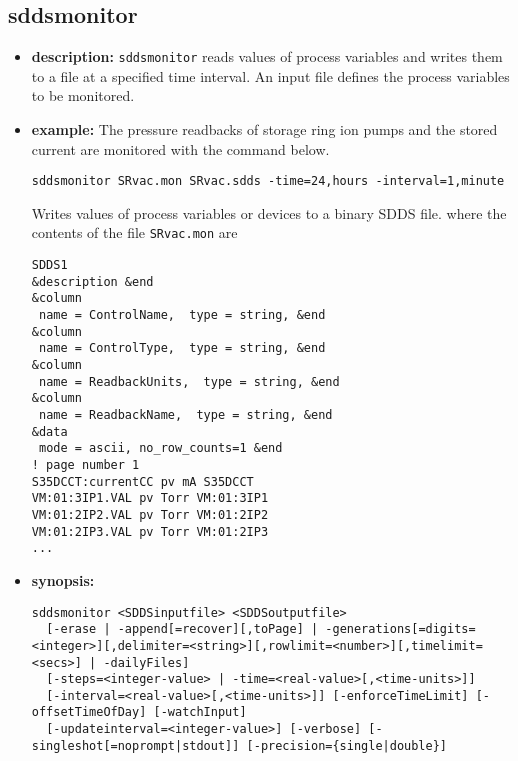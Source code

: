 %
%
\begin{latexonly}
\newpage
\end{latexonly}

%
%
\subsection{sddsmonitor}
\label{sddsmonitor}

\begin{itemize}
\item {\bf description:}
%
%
\verb+sddsmonitor+ reads values of process variables and writes them to a file at a specified time interval.
An input file defines the process variables to be monitored.
\item {\bf example:} 
%
% 
%
The pressure readbacks of storage ring ion pumps and the stored current are monitored
with the command below.
\begin{verbatim}
sddsmonitor SRvac.mon SRvac.sdds -time=24,hours -interval=1,minute
\end{verbatim}
Writes values of process variables or devices to a binary SDDS file.
where the contents of the file \verb+SRvac.mon+ are
\begin{verbatim}
SDDS1
&description &end
&column
 name = ControlName,  type = string, &end
&column
 name = ControlType,  type = string, &end
&column
 name = ReadbackUnits,  type = string, &end
&column
 name = ReadbackName,  type = string, &end
&data
 mode = ascii, no_row_counts=1 &end
! page number 1
S35DCCT:currentCC pv mA S35DCCT
VM:01:3IP1.VAL pv Torr VM:01:3IP1
VM:01:2IP2.VAL pv Torr VM:01:2IP2 
VM:01:2IP3.VAL pv Torr VM:01:2IP3 
...
\end{verbatim}
\item {\bf synopsis:} 
%
%
\begin{verbatim}
sddsmonitor <SDDSinputfile> <SDDSoutputfile>
  [-erase | -append[=recover][,toPage] | -generations[=digits=<integer>][,delimiter=<string>][,rowlimit=<number>][,timelimit=<secs>] | -dailyFiles]
  [-steps=<integer-value> | -time=<real-value>[,<time-units>]]
  [-interval=<real-value>[,<time-units>]] [-enforceTimeLimit] [-offsetTimeOfDay] [-watchInput]
  [-updateinterval=<integer-value>] [-verbose] [-singleshot[=noprompt|stdout]] [-precision={single|double}]

\end{verbatim}
\end{itemize}
